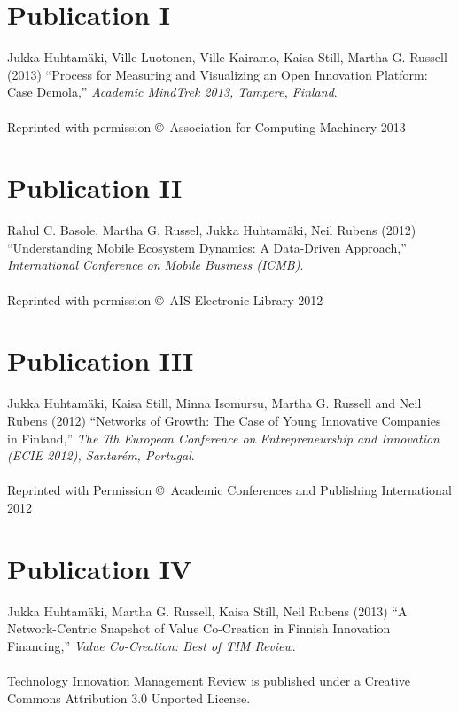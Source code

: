 \chapter*{Publication I}
\thispagestyle{empty}
Jukka Huhtamäki, Ville Luotonen, Ville Kairamo, Kaisa Still, Martha G. Russell 
(2013)
``Process for Measuring and Visualizing an Open Innovation Platform: Case Demola,''
\emph{Academic MindTrek 2013, Tampere, Finland}.
\\\\
Reprinted with permission \copyright\ Association for Computing Machinery 2013



\chapter*{Publication II}
\thispagestyle{empty}
Rahul C. Basole, Martha G. Russel, Jukka Huhtamäki, Neil Rubens
(2012)
``Understanding Mobile Ecosystem Dynamics: A Data-Driven Approach,''
\emph{International Conference on Mobile Business (ICMB)}.
\\\\
Reprinted with permission \copyright\ AIS Electronic Library 2012



\chapter*{Publication III}
\thispagestyle{empty}
Jukka Huhtamäki, Kaisa Still, Minna Isomursu, Martha G. Russell and Neil Rubens
(2012)
``Networks of Growth: The Case of Young Innovative Companies in Finland,'' 
\emph{The 7th European Conference on Entrepreneurship and Innovation (ECIE 2012), Santarém, Portugal}.
\\\\
\noindent Reprinted with Permission \copyright\ Academic Conferences and Publishing International 2012



\chapter*{Publication IV}
\thispagestyle{empty}
Jukka Huhtamäki, Martha G. Russell, Kaisa Still, Neil Rubens
(2013)
``A Network-Centric Snapshot of Value Co-Creation in Finnish Innovation Financing,''
\emph{Value Co-Creation: Best of TIM Review}.
\\\\
Technology Innovation Management Review is published under a Creative Commons Attribution 3.0 Unported License. 


